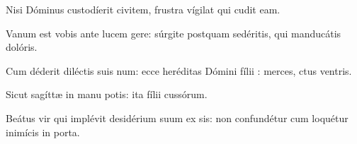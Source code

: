 \item {}

\item Nisi Dóminus custodíerit civitem,\psstar{} frustra vígilat qui cudit eam.

\item Vanum est vobis ante lucem gere:\psstar{} súrgite postquam sedéritis, qui manducátis  dolóris.

\item Cum déderit diléctis suis num:\psstar{} ecce heréditas Dómini fílii : merces, ctus ventris.

\item Sicut sagíttæ in manu potis:\psstar{} ita fílii cussórum.

\item Beátus vir qui implévit desidérium suum ex sis:\psstar{} non confundétur cum loquétur inimícis  in porta.

